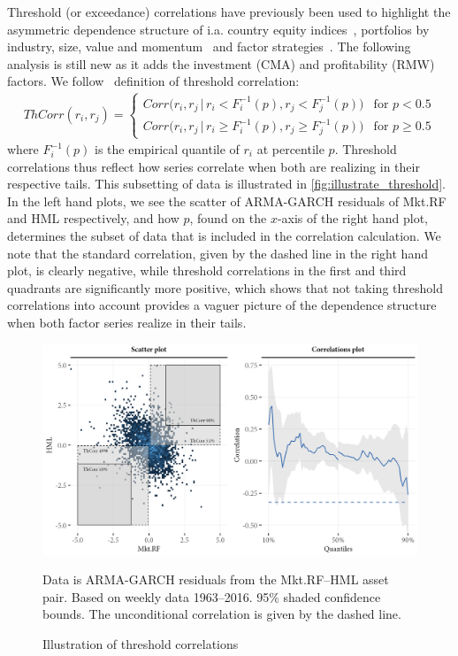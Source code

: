 Threshold (or exceedance) correlations have previously been used to highlight the asymmetric dependence structure of i.a. country equity indices~\autocite{LonginSolnik2001}, portfolios by industry, size, value and momentum~\autocite{AngChen2002} and factor strategies~\autocite{ChristoffersenLanglois2013}. The following analysis is still new as it adds the investment (CMA) and profitability (RMW) factors. We follow~\textcite{ChristoffersenLanglois2013} definition of threshold correlation:
\begin{align}
\label{eq:th_corr}
    ThCorr(r_i, r_j) = 
    \begin{cases} 
        Corr\Big(r_i, r_j \,|\, r_i < F_i^{-1}(p), r_j < F_j^{-1}(p)\Big)  & \text{for } p < 0.5 \\
        Corr\Big(r_i, r_j \,|\, r_i \geq F_i^{-1}(p), r_j \geq F_j^{-1}(p)\Big)  & \text{for } p \geq 0.5
    \end{cases}
\end{align}
where $F_i^{-1}(p)$ is the empirical quantile of $r_i$ at percentile $p$. Threshold correlations thus reflect how series correlate when both are realizing in their respective tails. This subsetting of data is illustrated in \autoref{fig:illustrate_threshold}. In the left hand plots, we see the scatter of ARMA-GARCH residuals of Mkt.RF and HML respectively, and how $p$, found on the $x$-axis of the right hand plot, determines the subset of data that is included in the correlation calculation. We note that the standard correlation, given by the dashed line in the right hand plot, is clearly negative, while threshold correlations in the first and third quadrants are significantly more positive, which shows that not taking threshold correlations into account provides a vaguer picture of the dependence structure when both factor series realize in their tails.

\begin{figure}[H]
  \centering
  \includegraphics[scale=1]{graphics/threshold_explain_res.png}
  \footnotesize
  \caption{Illustration of threshold correlations}
  \begin{longcaption}
    Data is ARMA-GARCH residuals from the Mkt.RF--HML asset pair. Based on weekly data 1963--2016. 95\% shaded confidence bounds. The unconditional correlation is given by the dashed line.
  \end{longcaption}
  \label{fig:illustrate_threshold}
\end{figure}

